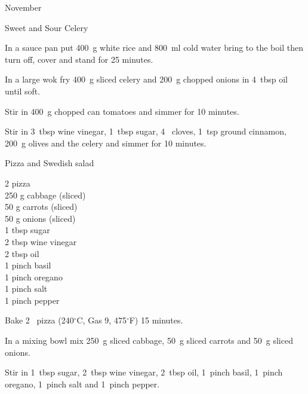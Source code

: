 \begin{menu}{November}
\begin{recipe}{2}{Sweet and Sour Celery}
\begin{ingredients}
		\end{ingredients}
	
    \begin{instructions}
    \item 
      In a
      sauce pan
      put
      400~g  white rice
      and
      800~ml  cold water
      bring to the boil then turn off, cover and stand for 25 minutes.
    \item 
        In a large wok fry
        400~g sliced celery
        and
        200~g chopped onions
        in
        4~tbsp  oil
        until soft.
      \item 
        Stir in
        400~g chopped can tomatoes
        and simmer for 10 minutes.
      \item 
        Stir in
        3~tbsp  wine vinegar,
        1~tbsp  sugar,
        4~  cloves,
        1~tsp  ground cinnamon,
        200~g  olives
        and the celery
        and simmer for 10 minutes.
      
    \end{instructions}
    \end{recipe}%
  
    \begin{recipe}{1}{Pizza and Swedish salad}%
    
		\begin{ingredients}
		2  pizza  \\
	250 g cabbage (sliced) \\
	50 g carrots (sliced) \\
	50 g onions (sliced) \\
	1 tbsp sugar  \\
	2 tbsp wine vinegar  \\
	2 tbsp oil  \\
	1 pinch basil  \\
	1 pinch oregano  \\
	1 pinch salt  \\
	1 pinch pepper  \\
	
		\end{ingredients}
	
	
    \begin{instructions}
    \item 
        Bake 2~  pizza
      (240$^{\circ}$C, Gas 9, 475$^{\circ}$F)
     15 minutes.
      \item 
        In a mixing bowl mix
        250~g sliced cabbage,
        50~g sliced carrots
        and
        50~g sliced onions.
      \item 
        Stir in
        1~tbsp  sugar,
        2~tbsp  wine vinegar,
        2~tbsp  oil,
        1~pinch  basil,
        1~pinch  oregano,
        1~pinch  salt
        and
        1~pinch  pepper.
      

\end{instructions}
\end{recipe}
\end{menu}
